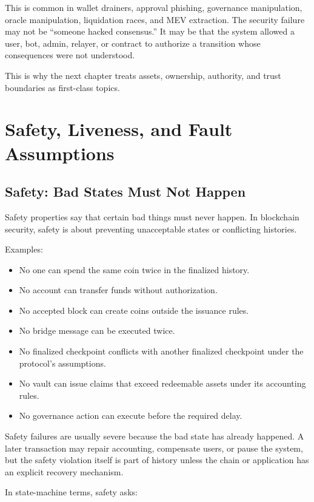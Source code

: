 This is common in wallet drainers, approval phishing, governance
manipulation, oracle manipulation, liquidation races, and MEV
extraction. The security failure may not be ``someone hacked
consensus.'' It may be that the system allowed a user, bot, admin,
relayer, or contract to authorize a transition whose consequences were
not understood.

This is why the next chapter treats assets, ownership, authority, and
trust boundaries as first-class topics.

\section{Safety, Liveness, and Fault Assumptions}

\subsection{Safety: Bad States Must Not Happen}

Safety properties say that certain bad things must never happen. In
blockchain security, safety is about preventing unacceptable states or
conflicting histories.

Examples:

\begin{itemize}
\tightlist
\item
  No one can spend the same coin twice in the finalized history.
\item
  No account can transfer funds without authorization.
\item
  No accepted block can create coins outside the issuance rules.
\item
  No bridge message can be executed twice.
\item
  No finalized checkpoint conflicts with another finalized checkpoint
  under the protocol's assumptions.
\item
  No vault can issue claims that exceed redeemable assets under its
  accounting rules.
\item
  No governance action can execute before the required delay.
\end{itemize}

Safety failures are usually severe because the bad state has already
happened. A later transaction may repair accounting, compensate users,
or pause the system, but the safety violation itself is part of history
unless the chain or application has an explicit recovery mechanism.

In state-machine terms, safety asks:

